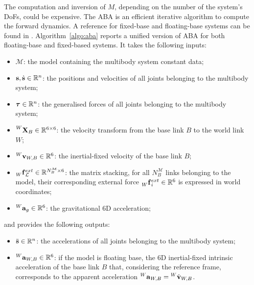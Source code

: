The computation and inversion of $M$, depending on the number of the system's \acp{DoF}, could be expensive.
The \ac{ABA} is an efficient iterative algorithm to compute the forward dynamics.
A reference for fixed-base and floating-base systems can be found in \parencite[Section~7.3 and Section~9.4]{featherstone_rigid_2008}.
Algorithm~\ref{algo:aba} reports a unified version of \ac{ABA} for both floating-base and fixed-based systems.
It takes the following inputs:
%
\begin{itemize}
    \item $\mathcal{M}$: the model containing the multibody system constant data;
    \item $\Shape, \Shaped \in \realn^n$: the positions and velocities of all joints belonging to the multibody system;
    \item $\Torques \in \realn^n$: the generalised forces of all joints belonging to the multibody system;
    \item $\transvel[W]_B \in \realn^{6\times6}$: the velocity transform from the base link $B$ to the world link $W$;
    \item $\velsix[W]_{W,B} \in \realn^6$: the inertial-fixed velocity of the base link $B$;
    \item $\forcesix[W]^{ext}_\mathcal{L} \in \realn^{N_B^\mathcal{M} \times 6}$: the matrix stacking, for all $N_B^\mathcal{M}$ links belonging to the model, their corresponding external force $\forcesix[W]_i^{ext} \in \realn^6$ is expressed in world coordinates;
    \item $\accsix[W]_g \in \realn^6$: the gravitational 6D acceleration;
\end{itemize}
%
and provides the following outputs:
%
\begin{itemize}
    \item $\Shapedd \in \realn^n$: the accelerations of all joints belonging to the multibody system;
    \item $\accsix[W]_{W,B} \in \realn^6$: if the model is floating base, the 6D inertial-fixed intrinsic acceleration of the base link $B$ that, considering the reference frame, corresponds to the apparent acceleration $\accsix[W]_{W,B} = {}^W \dot{\mathbf{v}}_{W,B}$.
\end{itemize}

